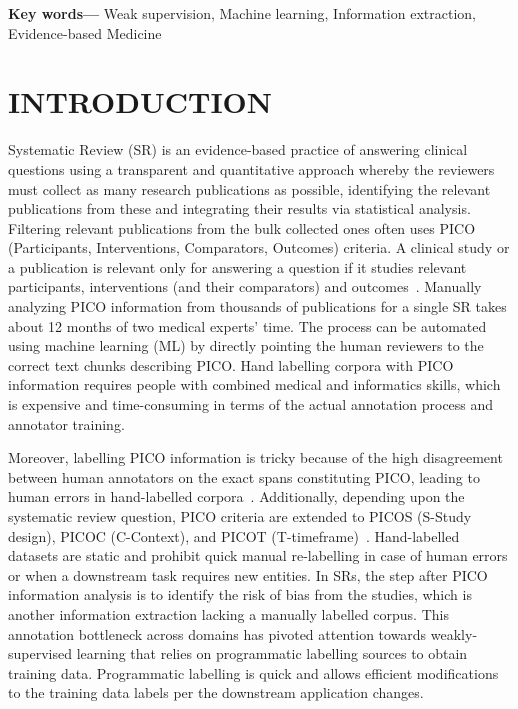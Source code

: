 \documentclass[10.7pt,]{article}
\providecommand{\keywords}[1]
{
  \small	
  \textbf{Key words---} #1
}
\begin{document}
\keywords{Weak supervision, Machine learning, Information extraction, Evidence-based Medicine}
%
\clearpage
%
%
%
\section{INTRODUCTION}\label{introduction}
%
Systematic Review (SR) is an evidence-based practice of answering clinical questions using a transparent and quantitative approach whereby the reviewers must collect as many research publications as possible, identifying the relevant publications from these and integrating their results via statistical analysis.
Filtering relevant publications from the bulk collected ones often uses PICO (Participants, Interventions, Comparators, Outcomes) criteria. 
A clinical study or a publication is relevant only for answering a question if it studies relevant participants, interventions (and their comparators) and outcomes~\cite{uman2011systematic}. 
Manually analyzing PICO information from thousands of publications for a single SR takes about 12 months of two medical experts' time.
The process can be automated using machine learning (ML) by directly pointing the human reviewers to the correct text chunks describing PICO.
Hand labelling corpora with PICO information requires people with combined medical and informatics skills, which is expensive and time-consuming in terms of the actual annotation process and annotator training.


Moreover, labelling PICO information is tricky because of the high disagreement between human annotators on the exact spans constituting PICO, leading to human errors in hand-labelled corpora~\cite{brockmeier2019improving}.
Additionally, depending upon the systematic review question, PICO criteria are extended to PICOS (S-Study design), PICOC (C-Context), and PICOT (T-timeframe)~\cite{riva2012your,methley2014pico,uman2011systematic}.
Hand-labelled datasets are static and prohibit quick manual re-labelling in case of human errors or when a downstream task requires new entities.
In SRs, the step after PICO information analysis is to identify the risk of bias from the studies, which is another information extraction lacking a manually labelled corpus. 
This annotation bottleneck across domains has pivoted attention towards weakly-supervised learning that relies on programmatic labelling sources to obtain training data.
Programmatic labelling is quick and allows efficient modifications to the training data labels per the downstream application changes.
\end{document}
